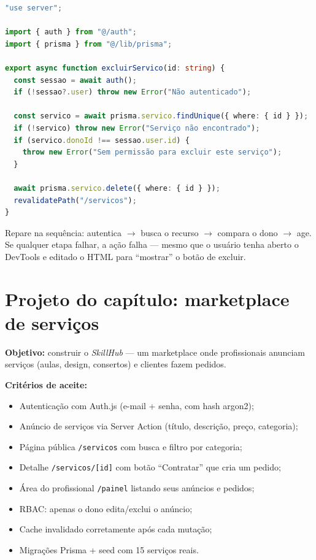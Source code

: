 \begin{lstlisting}[style=livro, language=TypeScript,
  caption={Autorização dentro de uma Server Action (RBAC).}, label={list:fullstack-rbac}]
"use server";

import { auth } from "@/auth";
import { prisma } from "@/lib/prisma";

export async function excluirServico(id: string) {
  const sessao = await auth();
  if (!sessao?.user) throw new Error("Não autenticado");

  const servico = await prisma.servico.findUnique({ where: { id } });
  if (!servico) throw new Error("Serviço não encontrado");
  if (servico.donoId !== sessao.user.id) {
    throw new Error("Sem permissão para excluir este serviço");
  }

  await prisma.servico.delete({ where: { id } });
  revalidatePath("/servicos");
}
\end{lstlisting}

Repare na sequência: autentica $\rightarrow$ busca o recurso $\rightarrow$
compara o dono $\rightarrow$ age. Se qualquer etapa falhar, a ação falha —
mesmo que o usuário tenha aberto o DevTools e editado o HTML para ``mostrar''
o botão de excluir.

\section{Projeto do capítulo: marketplace de serviços}

\begin{caixaprojeto}
\textbf{Objetivo:} construir o \emph{SkillHub} — um marketplace onde
profissionais anunciam serviços (aulas, design, consertos) e clientes fazem
pedidos.

\textbf{Critérios de aceite:}
\begin{itemize}[leftmargin=*, itemsep=0.2em]
  \item Autenticação com Auth.js (e-mail + senha, com hash argon2);
  \item Anúncio de serviços via Server Action (título, descrição, preço, categoria);
  \item Página pública \texttt{/servicos} com busca e filtro por categoria;
  \item Detalhe \texttt{/servicos/[id]} com botão ``Contratar'' que cria um pedido;
  \item Área do profissional \texttt{/painel} listando seus anúncios e pedidos;
  \item RBAC: apenas o dono edita/exclui o anúncio;
  \item Cache invalidado corretamente após cada mutação;
  \item Migrações Prisma + seed com 15 serviços reais.
\end{itemize}
\end{caixaprojeto}

